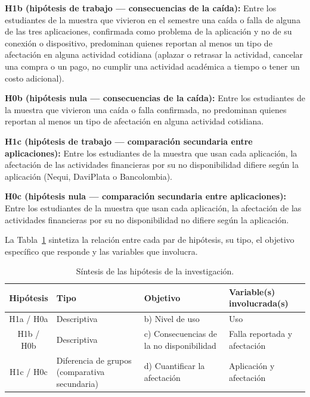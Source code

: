 \noindent\textbf{H1b (hipótesis de trabajo --- consecuencias de la caída):} Entre los estudiantes de la muestra que vivieron en el semestre una caída o falla de alguna de las tres aplicaciones, confirmada como problema de la aplicación y no de su conexión o dispositivo, predominan quienes reportan al menos un tipo de afectación en alguna actividad cotidiana (aplazar o retrasar la actividad, cancelar una compra o un pago, no cumplir una actividad académica a tiempo o tener un costo adicional).
\par\vspace{0.8em}

\noindent\textbf{H0b (hipótesis nula --- consecuencias de la caída):} Entre los estudiantes de la muestra que vivieron una caída o falla confirmada, no predominan quienes reportan al menos un tipo de afectación en alguna actividad cotidiana.
\par\vspace{1.2em}

\noindent\textbf{H1c (hipótesis de trabajo --- comparación secundaria entre aplicaciones):} Entre los estudiantes de la muestra que usan cada aplicación, la afectación de las actividades financieras por su no disponibilidad difiere según la aplicación (Nequi, DaviPlata o Bancolombia).
\par\vspace{0.8em}

\noindent\textbf{H0c (hipótesis nula --- comparación secundaria entre aplicaciones):} Entre los estudiantes de la muestra que usan cada aplicación, la afectación de las actividades financieras por su no disponibilidad no difiere según la aplicación.
\par\vspace{1.2em}

\noindent La Tabla~\ref{tab:hipotesis-resumen} sintetiza la relación entre cada par de hipótesis, su tipo, el objetivo específico que responde y las variables que involucra.

\begin{table}[!ht]
\centering
\small
\renewcommand{\arraystretch}{1.3}
\begin{tabular}{|c|p{3.4cm}|p{3.6cm}|p{4cm}|}
\hline
\textbf{Hipótesis} & \textbf{Tipo} & \textbf{Objetivo} & \textbf{Variable(s) involucrada(s)} \\ \hline
H1a / H0a & Descriptiva & b) Nivel de uso & Uso \\ \hline
H1b / H0b & Descriptiva & c) Consecuencias de la no disponibilidad & Falla reportada y afectación \\ \hline
H1c / H0c & Diferencia de grupos (comparativa secundaria) & d) Cuantificar la afectación & Aplicación y afectación \\ \hline
\end{tabular}
\caption{Síntesis de las hipótesis de la investigación.}
\label{tab:hipotesis-resumen}
\end{table}
